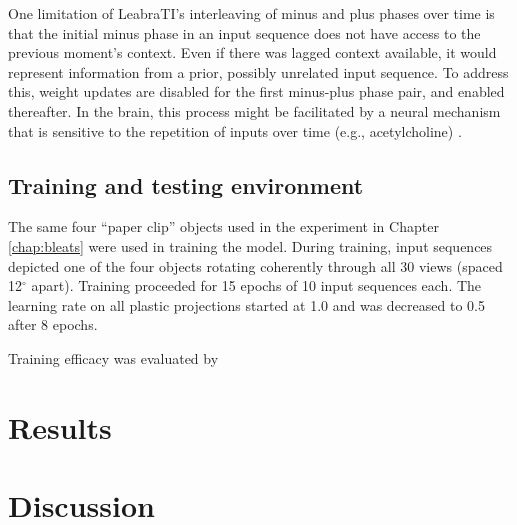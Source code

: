 \documentclass[dwyatte_dissertation.tex]{subfiles}
\begin{document}
One limitation of LeabraTI's interleaving of minus and plus phases over time is that the initial minus phase in an input sequence does not have access to the previous moment's  context. Even if there was lagged context available, it would represent information from a prior, possibly unrelated input sequence. To address this, weight updates are disabled for the first minus-plus phase pair, and enabled thereafter. In the brain, this process might be facilitated by a neural mechanism that is sensitive to the repetition of inputs over time (e.g., acetylcholine) \cite{ThielHensonMorrisEtAl01,ThielHensonDolan02}.

\subsection{Training and testing environment}
The same four ``paper clip'' objects used in the experiment in Chapter \ref{chap:bleats} were used in training the model. During training, input sequences depicted one of the four objects rotating coherently through all 30 views (spaced 12$^\circ$ apart). Training proceeded for 15 epochs of 10 input sequences each. The learning rate on all plastic projections started at 1.0 and was decreased to 0.5 after 8 epochs. 

Training efficacy was evaluated by 


\section{Results}

\section{Discussion}



\end{document}
